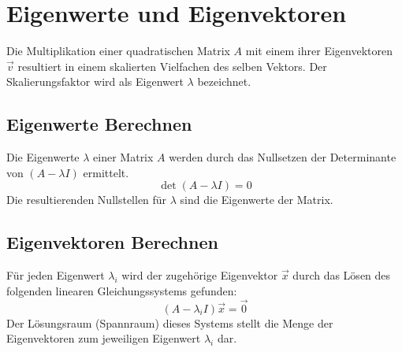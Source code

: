 \chapter{Eigenwerte und Eigenvektoren}
Die Multiplikation einer quadratischen Matrix $A$ mit einem ihrer Eigenvektoren
$\vec{v}$ resultiert in einem skalierten Vielfachen des selben Vektors. Der
Skalierungsfaktor wird als Eigenwert $\lambda$ bezeichnet.

\section{Eigenwerte Berechnen}
Die Eigenwerte $\lambda$ einer Matrix $A$ werden durch das Nullsetzen der
Determinante von $(A - \lambda I)$ ermittelt.
\[
    \det(A - \lambda I) = 0
\]
Die resultierenden Nullstellen für $\lambda$ sind die Eigenwerte der Matrix.

\section{Eigenvektoren Berechnen}
Für jeden Eigenwert $\lambda_i$ wird der zugehörige Eigenvektor $\vec{x}$ durch
das Lösen des folgenden linearen Gleichungssystems gefunden:
\[
    (A - \lambda_i I) \vec{x} = \vec{0}
\]
Der Lösungsraum (Spannraum) dieses Systems stellt die Menge der Eigenvektoren
zum jeweiligen Eigenwert $\lambda_i$ dar.